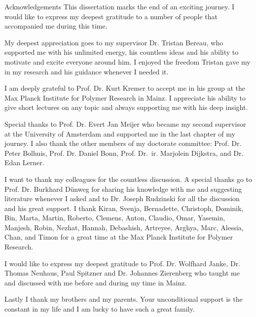 \begin{newenv}{Acknowledgements}
This dissertation marks the end of an exciting journey. I would like to express my deepest gratitude to a number of people that accompanied me during this time. 

My deepest appreciation goes to my supervisor Dr. Tristan Bereau, who supported me with his unlimited energy, his countless ideas and his ability to motivate and excite everyone around him. I enjoyed the freedom Tristan gave my in my research and his guidance whenever I needed it.   

I am deeply grateful to Prof. Dr. Kurt Kremer to accept me in his group at the Max Planck Institute for Polymer Research in Mainz. I appreciate his ability to give short lectures on any topic and always supporting me with his deep insight.

Special thanks to Prof. Dr. Evert Jan Meijer who became my second supervisor at the University of Amsterdam and supported me in the last chapter of my journey. I also thank the other members of my doctorate committee: Prof. Dr. Peter Bolhuis, Prof. Dr. Daniel Bonn, Prof. Dr.~ir. Marjolein Dijkstra, and Dr. Edan Lerner. 

I want to thank my colleagues for the countless discussion. A special thanks go to Prof. Dr. Burkhard D\"{u}nweg for sharing his knowledge with me and suggesting literature whenever I asked and to Dr. Joseph Rudzinski for all the discussion and his great support. I thank Kiran, Svenja, Bernadette, Christoph, Dominik, Bin, Marta, Martin, Roberto, Clemens, Anton, Claudio, Omar, Yasemin, Manjesh, Robin, Nezhat, Hannah, Debashish, Artreyee, Arghya, Marc, Alessia, Chan, and Timon for a great time at the Max Planck Institute for Polymer Research.

I would like to express my deepest gratitude to Prof. Dr. Wolfhard Janke, Dr. Thomas Neuhaus, Paul Spitzner and Dr. Johannes Zierenberg who taught me and discussed with me before and during my time in Mainz. 

Lastly I thank my brothers and my parents. Your unconditional support is the constant in my life and I am lucky to have such a great family. 


\end{newenv}
